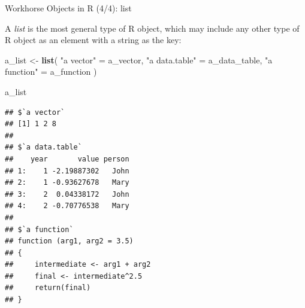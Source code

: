 \documentclass[10pt,ignorenonframetext,]{beamer}
\newenvironment{Shaded}{\begin{snugshade}}{\end{snugshade}}
\newcommand{\KeywordTok}[1]{\textcolor[rgb]{0.13,0.29,0.53}{\textbf{{#1}}}}
\newcommand{\StringTok}[1]{\textcolor[rgb]{0.31,0.60,0.02}{{#1}}}
\newcommand{\NormalTok}[1]{{#1}}
\begin{document}
\begin{frame}[fragile]{Workhorse Objects in R (4/4): list}

A \emph{list} is the most general type of R object, which may include
any other type of R object as an element with a string as the key:

\tiny

\begin{Shaded}
\begin{Highlighting}[]
\NormalTok{a_list <-}\StringTok{ }\KeywordTok{list}\NormalTok{(}
  \StringTok{"a vector"} \NormalTok{=}\StringTok{ }\NormalTok{a_vector,}
  \StringTok{"a data.table"} \NormalTok{=}\StringTok{ }\NormalTok{a_data_table,}
  \StringTok{"a function"} \NormalTok{=}\StringTok{ }\NormalTok{a_function}
\NormalTok{)}

\NormalTok{a_list}
\end{Highlighting}
\end{Shaded}

\begin{verbatim}
## $`a vector`
## [1] 1 2 8
## 
## $`a data.table`
##    year       value person
## 1:    1 -2.19887302   John
## 2:    1 -0.93627678   Mary
## 3:    2  0.04338172   John
## 4:    2 -0.70776538   Mary
## 
## $`a function`
## function (arg1, arg2 = 3.5) 
## {
##     intermediate <- arg1 + arg2
##     final <- intermediate^2.5
##     return(final)
## }
\end{verbatim}

\normalsize

\end{frame}
\end{document}
